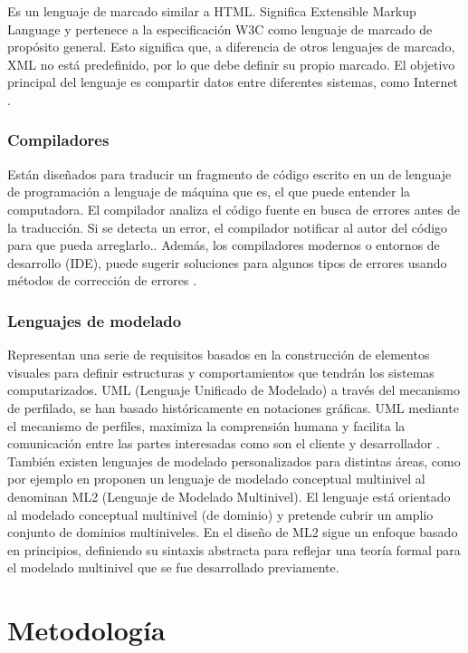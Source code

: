 \documentclass[12pt, openany, xcolor=table]{book}
\begin{document}
    Es un lenguaje de marcado similar a HTML. Significa Extensible Markup Language y pertenece a la especificación W3C como lenguaje de marcado de propósito general. Esto significa que, a diferencia de otros lenguajes de marcado, XML no está predefinido, por lo que debe definir su propio marcado. El objetivo principal del lenguaje es compartir datos entre diferentes sistemas, como Internet \cite{XML-based}.
    
    \subsection{Compiladores}
    Están diseñados para traducir un fragmento de código escrito en un de lenguaje de programación a lenguaje de máquina que es, el que puede entender la computadora. El compilador analiza el código fuente en busca de errores antes de la traducción. Si se detecta un error, el compilador
    notificar al autor del código para que pueda arreglarlo.. Además, los compiladores modernos o entornos de desarrollo (IDE), puede sugerir soluciones para algunos tipos de errores usando métodos de corrección de errores \cite{CoEdit}.
    
    \subsection{Lenguajes de modelado}
    Representan una serie de requisitos basados en la construcción de elementos visuales para definir estructuras y comportamientos que tendrán los sistemas computarizados. UML (Lenguaje Unificado de Modelado) a través del mecanismo de perfilado, se han basado históricamente en notaciones gráficas. UML mediante el mecanismo de perfiles, maximiza la comprensión humana y facilita la comunicación entre las partes interesadas como son el cliente y desarrollador \cite{Blended}. \\
    
    También existen lenguajes de modelado personalizados para distintas áreas, como por ejemplo en \cite{Multi-level} proponen un lenguaje de modelado conceptual multinivel al denominan ML2 (Lenguaje de Modelado Multinivel). El lenguaje está orientado al modelado conceptual multinivel (de dominio) y pretende cubrir un amplio conjunto de dominios multiniveles. En el diseño de ML2 sigue un enfoque basado en principios, definiendo su sintaxis abstracta para reflejar una teoría formal para el modelado multinivel que se fue desarrollado previamente.
	
	\chapter{Metodología}
	
\end{document}
